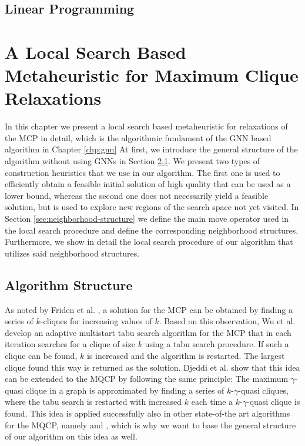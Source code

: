 \documentclass[draft,final]{vutinfth} %
\begin{document}
\section{Linear Programming}


\chapter{A Local Search Based Metaheuristic for Maximum Clique Relaxations}\label{chp:local-search-algorithm}

In this chapter we present a local search based metaheuristic for relaxations of the MCP in detail, which is the algorithmic fundament of the GNN based algorithm in Chapter \ref{chp:gnn}
At first, we introduce the general structure of the algorithm without using GNNs in Section \ref{sec:algorithm-structure}. We present two types of construction heuristics that we use in our algorithm. The first one is used to efficiently obtain a feasible initial solution of high quality that can be used as a lower bound, whereas the second one does not necessarily yield a feasible solution, but is used to explore new regions of the search space not yet visited. In Section \ref{sec:neighborhood-structure} we define the main move operator used in the local search procedure and define the corresponding neighborhood structures. Furthermore, we show in detail the local search procedure of our algorithm that utilizes said neighborhood structures. 

\section{Algorithm Structure} \label{sec:algorithm-structure}

As noted by Friden et al. \cite{Friden1989}, a solution for the MCP can be obtained by finding a series of $k$-cliques for increasing values of $k$. Based on this observation, Wu et al. \cite{WuH13} develop an adaptive multistart tabu search algorithm for the MCP that in each iteration searches for a clique of size $k$ using a tabu search procedure. If such a clique can be found, $k$ is increased and the algorithm is restarted. The largest clique found this way is returned as the solution. Djeddi et al. \cite{djeddi_extension_2019} show that this idea can be extended to the MQCP by following the same principle: The maximum $\gamma$-quasi clique in a graph is approximated by finding a series of $k$-$\gamma$-quasi cliques, where the tabu search is restarted with increased $k$ each time a $k$-$\gamma$-quasi clique is found. This idea is applied successfully also in other state-of-the art algorithms for the MQCP, namely \cite{zhou_opposition-based_2020} and \cite{chen_nuqclq_2021}, which is why we want to base the general structure of our algorithm on this idea as well. 
\end{document}
